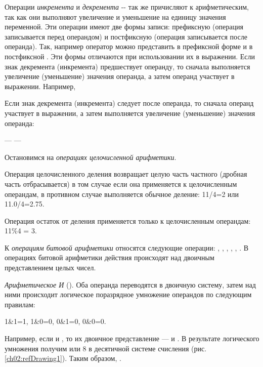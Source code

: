 Операции \emph{инкремента} \Sys{++} и
\emph{декремента} -{}-  так же причисляют к
арифметическим, так как они выполняют увеличение и уменьшение на единицу значения переменной. Эти операции имеют две
формы записи: префиксную (операция записывается перед операндом) и постфиксную (операция записывается после операнда).
Так, например оператор   можно представить в префиксной форме  и в
постфиксной . Эти формы отличаются при использовании их в выражении. Если знак декремента
(инкремента) предшествует операнду, то сначала выполняется увеличение (уменьшение) значения операнда, а затем операнд
участвует в выражении. Например, 

{}


Если знак декремента (инкремента) следует после операнда, то сначала операнд участвует в выражении, а затем выполняется
увеличение (уменьшение) значения операнда:

{}

 ---  --- 

Остановимся на \emph{операциях целочисленной
арифметики}. 

Операция целочисленного деления \Sys{/} возвращает целую часть частного (дробная часть отбрасывается) в том
случае если она применяется к целочисленным операндам, в противном случае выполняется обычное деление: 11/4=2 или
11.0/4=2.75.

Операция остаток от деления \Sys{\%} применяется только к целочисленным операндам: 11\%4 = 3.

К \emph{операциям битовой арифметики} относятся
следующие операции: \Sys{\&}, \Sys{{\textbar}}, \Sys{\^{}},
\Sys{\~{}}, \Sys{{\textless}{\textless}}, \Sys{{\textgreater}{\textgreater}}. В
операциях битовой арифметики действия происходят над двоичным представлением целых чисел. 

\emph{Арифметическое И} (\Sys{\&}). Оба операнда переводятся в двоичную систему, затем над
ними происходит логическое поразрядное умножение операндов по следующим правилам: 

1\&1=1, 1\&0=0, 0\&1=0, 0\&0=0. 

Например, если  и , то их двоичное представление ---
 и . В результате логического умножения
 получим  или 8 в десятичной системе
счисления (рис. \ref{ch02:refDrawing1}). Таким образом, .

